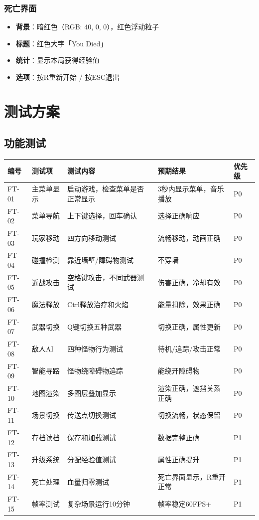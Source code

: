 \documentclass[12pt,a4paper]{article}
\begin{document}
\subsubsection{死亡界面}

\begin{itemize}[leftmargin=2em]
    \item \textbf{背景}：暗红色（RGB: 40, 0, 0），红色浮动粒子
    \item \textbf{标题}：红色大字「You Died」
    \item \textbf{统计}：显示本局获得经验值
    \item \textbf{选项}：按R重新开始 / 按ESC退出
\end{itemize}


\section{测试方案}

\subsection{功能测试}

\begin{longtable}{p{0.5cm}p{2.5cm}p{5cm}p{2cm}p{2cm}}
\toprule
\textbf{编号} & \textbf{测试项} & \textbf{测试内容} & \textbf{预期结果} & \textbf{优先级} \\
\midrule
\endhead
FT-01 & 主菜单显示 & 启动游戏，检查菜单是否正常显示 & 3秒内显示菜单，音乐播放 & P0 \\
FT-02 & 菜单导航 & 上下键选择，回车确认 & 选择正确响应 & P0 \\
FT-03 & 玩家移动 & 四方向移动测试 & 流畅移动，动画正确 & P0 \\
FT-04 & 碰撞检测 & 靠近墙壁/障碍物测试 & 不穿墙 & P0 \\
FT-05 & 近战攻击 & 空格键攻击，不同武器测试 & 伤害正确，冷却有效 & P0 \\
FT-06 & 魔法释放 & Ctrl释放治疗和火焰 & 能量扣除，效果正确 & P0 \\
FT-07 & 武器切换 & Q键切换五种武器 & 切换正确，属性更新 & P0 \\
FT-08 & 敌人AI & 四种怪物行为测试 & 待机/追踪/攻击正常 & P0 \\
FT-09 & 智能寻路 & 怪物绕障碍物追踪 & 能绕开障碍物 & P0 \\
FT-10 & 地图渲染 & 多图层叠加显示 & 渲染正确，遮挡关系正确 & P0 \\
FT-11 & 场景切换 & 传送点切换测试 & 切换流畅，状态保留 & P0 \\
FT-12 & 存档读档 & 保存和加载测试 & 数据完整正确 & P1 \\
FT-13 & 升级系统 & 分配经验值测试 & 属性正确提升 & P1 \\
FT-14 & 死亡处理 & 血量归零测试 & 死亡界面显示，R重开正常 & P1 \\
FT-15 & 帧率测试 & 复杂场景运行10分钟 & 帧率稳定60FPS+ & P1 \\
\bottomrule
\end{longtable}
\end{document}
